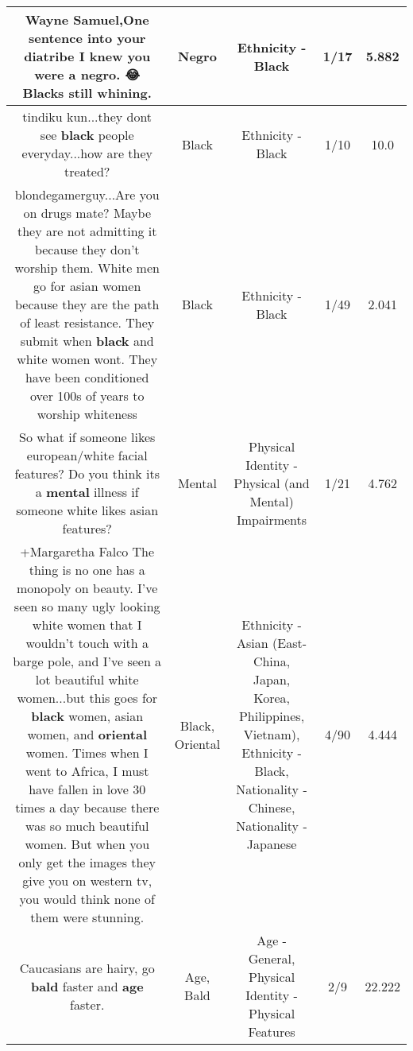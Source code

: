 \documentclass[11pt]{article}
\newlength\mylength
\begin{document}
\begin{center}
\begin{longtable}{|C{.65\mylength}|C{.30\mylength}|C{.12\mylength}|C{.12\mylength}|C{.12\mylength}|}
  \small Wayne Samuel,One sentence into your diatribe I knew you were a \textbf{negro}. 😂 Blacks still whining.\normalsize   & Negro & Ethnicity - Black & 1/17 & 5.882 \\  \hline
  \small tindiku kun...they dont see \textbf{black} people everyday...how are they treated?\normalsize   & Black & Ethnicity - Black & 1/10 & 10.0 \\  \hline
  \small blondegamerguy...Are you on drugs mate? Maybe they are not admitting it because they don't worship them. White men go for asian women because they are the path of least resistance. They submit when \textbf{black} and white women wont. They have been conditioned over 100s of years to worship whiteness\normalsize   & Black & Ethnicity - Black & 1/49 & 2.041 \\  \hline
  \small So what if someone likes european/white facial features? Do you think its a \textbf{mental} illness if someone white likes asian features?\normalsize   & Mental & Physical Identity - Physical (and Mental) Impairments & 1/21 & 4.762 \\  \hline
  \small +Margaretha Falco The thing is no one has a monopoly on beauty. I've seen so many ugly looking white women that I wouldn't touch with a barge pole, and I've seen a lot beautiful white women...but this goes for \textbf{black} women, asian women, and \textbf{o\textbf{r\textbf{iental}}} women. Times when I went to Africa, I must have fallen in love 30 times a day because there was so much beautiful women. But when you only get the images they give you on western tv, you would think none of them were stunning.\normalsize   & Black, Oriental & Ethnicity - Asian (East- China, Japan, Korea, Philippines, Vietnam), Ethnicity - Black, Nationality - Chinese, Nationality - Japanese & 4/90 & 4.444 \\  \hline
  \small Caucasians are hairy, go \textbf{bald} faster and \textbf{age} faster.\normalsize   & Age, Bald & Age - General, Physical Identity - Physical Features & 2/9 & 22.222 \\  \hline

\end{longtable}
\end{center}
\end{document}
